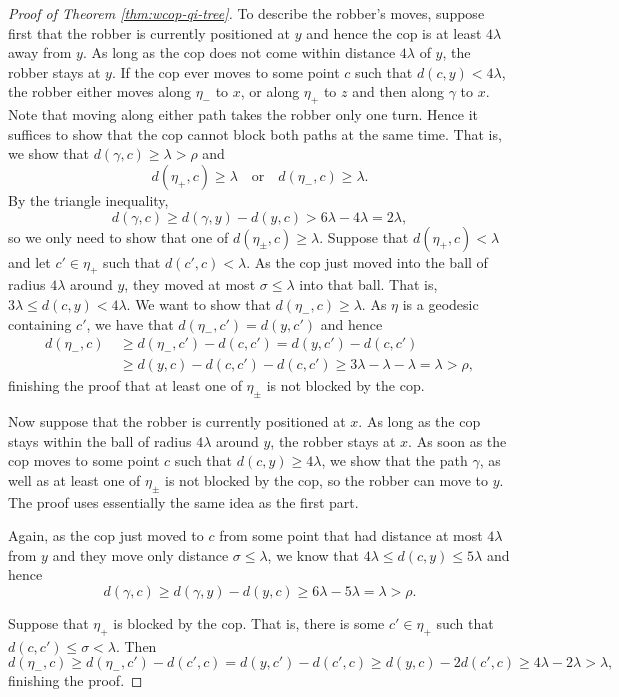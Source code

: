 \documentclass{amsart}
\theoremstyle{definition}
\theoremstyle{remark}
\theoremstyle{remark}
\theoremstyle{definition}
\renewcommand{\leq}{\leqslant}
\renewcommand{\geq}{\geqslant}
\begin{document}
\begin{proof}[Proof of Theorem \ref{thm:wcop-qi-tree}]
	To describe the robber's moves, suppose first that the robber is currently positioned at \(y\) and hence the cop is at least \(4\lambda\) away from \(y\).
	As long as the cop does not come within distance \(4\lambda\) of \(y\), the robber stays at \(y\).
	If the cop ever moves to some point \(c\) such that \(d(c, y) < 4\lambda\), the robber either moves along \(\eta_-\) to \(x\), or along \(\eta_+\) to \(z\) and then along \(\gamma \) to \(x\). Note that moving along either path takes the robber only one turn.
	Hence it suffices to show that the cop cannot block both paths at the same time.
	That is, we show that $d(\gamma, c) \geq \lambda > \rho$ and \[
		 d(\eta_+, c) \geq \lambda \quad\text{or}\quad d(\eta_-, c) \geq \lambda.
	\]
	By the triangle inequality, \[
		d(\gamma, c) \geq d(\gamma , y) - d(y, c) > 6\lambda - 4\lambda = 2\lambda,
	\]
	so we only need to show that one of \(d(\eta_\pm, c) \geq \lambda\).
	Suppose that \(d(\eta_+, c) < \lambda\) and let \(c' \in \eta_+\) such that \(d(c', c) < \lambda\).
	As the cop just moved into the ball of radius \(4\lambda\) around \(y\), they moved at most \(\sigma \leq \lambda\) into that ball. That is, \(3\lambda \leq d(c, y) < 4\lambda\).
	We want to show that \(d(\eta_-, c) \geq \lambda\).
	As \(\eta\) is a geodesic containing \(c'\), we have that \(d(\eta_-, c') = d(y, c')\) and hence \begin{align*}
		d(\eta_-, c) &~\geq d(\eta_-, c') - d(c, c') = d(y, c') - d(c, c')\\
		&~\geq d(y, c) - d(c, c') - d(c, c')
		\geq 3\lambda - \lambda - \lambda = \lambda> \rho,
	\end{align*}
    finishing the proof that at least one of \(\eta_\pm\) is not blocked by the cop.

	Now suppose that the robber is currently positioned at \(x\).
	As long as the cop stays within the ball of radius \(4\lambda\) around \(y\), the robber stays at \(x\).
	As soon as the cop moves to some point \(c\) such that \(d(c, y) \geq 4\lambda\), we show that the path \(\gamma\), as well as at least one of \(\eta_\pm\) is not blocked by the cop, so the robber can move to \(y\).
	The proof uses essentially the same idea as the first part.

	Again, as the cop just moved to \(c\) from some point that had distance at most \(4\lambda\) from \(y\) and they move only distance \(\sigma \leq \lambda\), we know that \(4\lambda \leq d(c, y) \leq 5\lambda\) and hence \[
		d(\gamma, c) \geq d(\gamma, y) - d(y, c) \geq 6\lambda - 5\lambda = \lambda> \rho.
	\]

	Suppose that \(\eta_+\) is blocked by the cop. That is, there is some \(c' \in \eta_+\) such that \(d(c, c') \leq \sigma < \lambda\).
	Then \[
		d(\eta_-, c) \geq d(\eta_-, c') - d(c', c) = d(y, c') - d(c', c) \geq d(y, c) - 2d(c', c) \geq 4\lambda - 2\lambda > \lambda,
	\] finishing the proof.
\end{proof}
\end{document}
